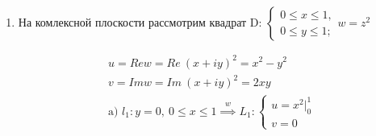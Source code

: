 \documentclass[../../main.tex]{subfiles}
\begin{document}
\begin{examples}
\begin{enumerate}
\[\begin{gathered}
\text{Длина }L \stackrel{\eqref{lec30:1}}{=}
\left[
  \begin{array}{ccc}
     f^\prime\left(z\right) = \left(z^2\right) = 2z
  \end{array}
\right]
= \int\limits_l{2|z|\ |dz|} = 
\left[
  \begin{array}{ccc}
     z = 1 + iy\\
     y|_{-1}^1
  \end{array}
\right]
=  
\left[
  \begin{array}{ccc}
     |z| = \sqrt{1 + y^2}\\
     dz = idy \implies |dz| = dy
  \end{array}
\right]\\
= 2 \int\limits_{-1}^1{\sqrt{1 + y^2}\ dy} = 
4\int\limits_0^1{\sqrt{1 + y^2}\ dy} = 4
\left[
  \begin{array}{ccc}
     \sqrt{1 + y^2} + \ln(y + \sqrt{1 + y^2})
  \end{array}
\right]_0^1 = 
4(\sqrt{2} + \ln(1 + \sqrt{2}))
\end{gathered}\]


\item На комлексной плоскости рассмотрим квадрат D:
$\begin{cases}
    0 \leq x \leq 1,\\
    0 \leq y \leq 1;
\end{cases} w = z^2$



\[\begin{gathered}
u = Re w = Re\ (x + iy)^2 = x^2 - y^2 \\
v = Im w = Im\ (x + iy)^2 = 2xy\\
    \text{a) }  l_1: y = 0,\ 0 \leq x \leq 1 \stackrel{w}{\implies}
L_1:
\begin{cases}
    u = x^2|_0^1\\
    v = 0
\end{cases}
\end{gathered}\]



\end{enumerate}
\end{examples}
\end{document}
